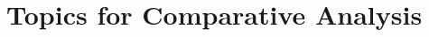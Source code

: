 







\section{\statusgreen Topics for Comparative Analysis}
\label{sec:topic_topic_granularities}


